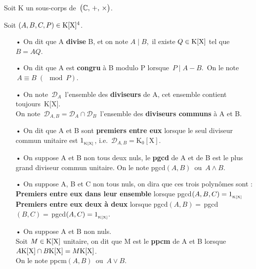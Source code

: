 \begin{center}
    Soit K un sous-corps de $\,\bigl(\mathbb{C},\,+,\,\times\bigr)$.
\end{center}

\vspace{0.3cm}

Soit \((A,B,C,P)\in \text{K}[\text{X}]^4\).
\begin{itemize}[leftmargin=0.5cm]
    \item[•] On dit que A \textbf{divise} B, et on note $A\mid B$,\, \ssi il existe $Q\in \text{K}[\text{X}]$ tel que $B=AQ$.
    
    \item[•] On dit que A est \textbf{congru} à B modulo P lorsque \(\,P\mid A-B.\)\, On le note \(\, A\equiv B\; (\!\!\!\!\mod P)\).
    
    \item[•] On note \(\,\mathcal{D}_A\,\) l'ensemble des \textbf{diviseurs} de A, cet ensemble contient toujours\, K$[$X$]$.\\
    On note \(\,\mathcal{D}_{A,B}=\mathcal{D}_A\cap\mathcal{D}_B\,\) l'ensemble des \textbf{diviseurs communs} à A et B.

    \item[•] On dit que A et B sont \textbf{premiers entre eux} lorsque le seul diviseur commun unitaire est $1_{_{\text{K}[\text{X}]}}$, i.e. \(\,\mathcal{D}_{A,B}=\text{K}_0[\text{X}]\).
    
    \item[•] On suppose A et B non tous deux nuls, le \textbf{pgcd} de A et de B est le plus grand diviseur commun unitaire. On le note pgcd$(A,B)\,$ ou $\,A\land B$.
    
    \item[•] On suppose A, B et C non tous nuls, on dira que ces trois polynômes sont : \\
    \textbf{Premiers entre eux dans leur ensemble} lorsque pgcd$(A,B,C)=1_{_{\text{K}[\text{X}]}}$\\
    \textbf{Premiers entre eux deux à deux} lorsque pgcd$(A,B)=\,$pgcd$(B,C)=\,$pgcd$(A,C)=1_{_{\text{K}[\text{X}]}}.$

    \item[•] On suppose A et B non nuls.\\
    Soit $M\in \text{K}[\text{X}]$ unitaire, on dit que M est le \textbf{ppcm} de A et B lorsque \(A\text{K}[\text{X}]\cap B\text{K}[\text{X}]=M\text{K}[\text{X}]\).\\
    On le note ppcm$(A,B)\,$ ou $\,A\lor B$.


\end{itemize}
